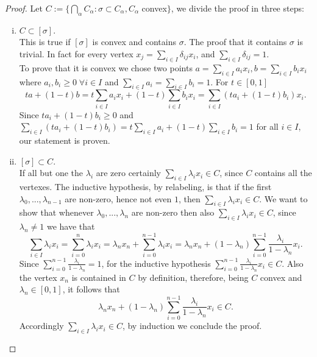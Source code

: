 \documentclass[../1.tex]{subfiles}
\begin{document}
    \begin{proof}
        Let $C := \{ \bigcap_\alpha C_\alpha : \sigma \subset C_\alpha, C_\alpha$ convex$\}$, we divide the proof in three steps:
        \begin{enumerate}[(i)]
            \item $C \subset [\sigma]$.\\
            This is true if $[\sigma]$ is convex and contains $\sigma$.
            The proof that it contains $\sigma$ is trivial. In fact for every vertex $x_j = \sum_{i \in I} \delta_{ij} x_i$,
            and $\sum_{i \in I}\delta_{ij} = 1$.\\
            To prove that it is convex we chose two points $a = \sum_{i \in I} a_i x_i, b = \sum_{i \in I} b_i x_i$ \\
            where $a_i,b_i \geq 0 \; \forall i \in I$ and $\sum_{i \in I} a_i = \sum_{i \in I} b_i = 1$. For $t \in [0,1]$
            \[ ta+(1-t)b = t\sum_{i \in I} a_i x_i + (1-t) \sum_{i \in I} b_i x_i = \sum_{i \in I} (ta_i + (1-t)b_i)x_i.\]
            Since $ta_i + (1-t)b_i \geq 0$ and $\sum_{i \in I} (ta_i + (1-t)b_i) = t\sum_{i \in I}a_i + (1-t)\sum_{i \in I}b_i = 1$ for all $i \in I$,
            our statement is proven.

            \item $[\sigma] \subset C$.\\
            If all but one the $\lambda_i$ are zero certainly $\sum_{i \in I} \lambda_i x_i \in C$, since $C$ contains all the vertexes.
            The inductive hypothesis, by relabeling, is that if the first $\lambda_0,...,\lambda_{n-1}$ are non-zero, hence not even $1$, then $\sum_{i \in I} \lambda_i x_i \in C$.
            We want to show that whenever $\lambda_0,...,\lambda_n$ are non-zero then also $\sum_{i \in I} \lambda_i x_i \in C$, since $\lambda_n \neq 1$ we have that
            \[ \sum_{i \in I} \lambda_i x_i =  \sum_{i = 0}^n \lambda_i x_i = \lambda_n x_n + \sum_{i = 0}^{n-1} \lambda_i x_i =
               \lambda_n x_n + (1 - \lambda_n) \sum_{i = 0}^{n-1} \frac{\lambda_i}{1 - \lambda_n} x_i.\]
            Since $\sum_{i = 0}^{n-1} \frac{\lambda_i}{1 - \lambda_n} = 1$, for the inductive hypothesis $\sum_{i = 0}^{n-1} \frac{\lambda_i}{1 - \lambda_n} x_i \in C$.
            Also the vertex $x_n$ is contained in $C$ by definition, therefore, being $C$ convex and $\lambda_n \in [0,1]$, it follows that 
            \[ \lambda_n x_n + (1 - \lambda_n) \sum_{i = 0}^{n-1} \frac{\lambda_i}{1 - \lambda_n} x_i \in C. \]
            Accordingly $\sum_{i \in I} \lambda_i x_i \in C$, by induction we conclude the proof.


\end{enumerate}
\end{proof}
\end{document}
